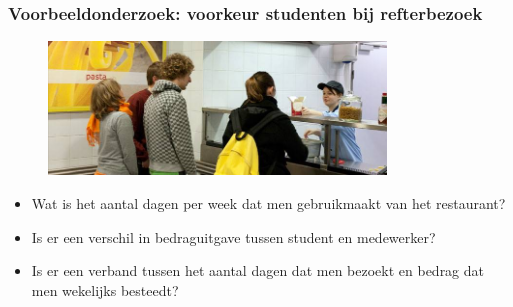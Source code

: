 \documentclass{beamer}
\begin{document}
  \begin{frame}
    \frametitle{Voorbeeldonderzoek: voorkeur studenten bij refterbezoek}

    \begin{figure}
      \centering
      \includegraphics[width=0.8\textwidth] {img/students.jpg}
      \label{fig:students}
    \end{figure}

    \begin{itemize}
      \item Wat is het aantal dagen per week dat men gebruikmaakt van het restaurant?
      \item Is er een verschil in bedraguitgave tussen student en medewerker?
      \item Is er een verband tussen het aantal dagen dat men bezoekt en bedrag dat men wekelijks besteedt?
    \end{itemize}
  \end{frame}
\end{document}
